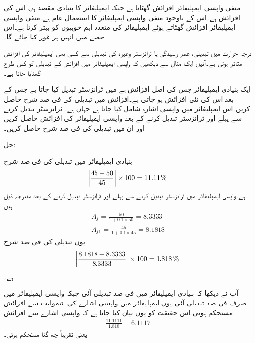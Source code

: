 منفی واپسی ایمپلیفائر افزائش گھٹاتا ہے جبکہ ایمپلیفائر کا بنیادی مقصد ہی اس کی افزائش ہے۔اس کے باوجود منفی واپسی ایمپلیفائر کا استعمال عام ہے۔منفی واپسی ایمپلیفائر افزائش گھٹاتے ہوئے ایمپلیفائر کی متعدد اہم  خوبیوں کو بہتر کرتا ہے۔اس حصے میں انہیں پر غور کیا جائے گا۔



درجہ حرارت میں تبدیلی، عمر رسیدگی یا ٹرانزسٹر وغیرہ کی تبدیلی سے کسی بھی ایمپلیفائر کی افزائش متاثر  ہوتی ہے۔آئیں ایک مثال سے دیکھیں کہ واپسی ایمپلیفائر میں افزائش کے تبدیلی کو کس طرح گھٹایا جاتا ہے۔

ایک بنیادی ایمپلیفائر جس کی اصل افزائش   ہے میں ٹرانزسٹر تبدیل کیا جاتا ہے جس کے بعد اس کی نئی افزائش   ہو جاتی ہے۔افزائش میں تبدیلی  کی فی صد شرح حاصل کریں۔اس ایمپلیفائر میں واپسی اشارہ شامل کیا جاتا ہے جہاں  ہے۔ ٹرانزسٹر تبدیل کرنے سے پہلے اور ٹرانزسٹر تبدیل کرنے کے بعد واپسی ایمپلیفائر کی افزائش حاصل کریں اور ان میں تبدیلی کی فی صد شرح حاصل کریں۔

حل:

بنیادی ایمپلیفائر میں تبدیلی کی فی صد شرح 
\begin{align*}
\abs{\frac{45-50}{45}} \times 100=\SI{11.11}{\%}
\end{align*}
ہے۔واپسی ایمپلیفائر  میں ٹرانزسٹر تبدیل کرنے سے پہلے  اور ٹرانزسٹر تبدیل کرنے کے بعد  مندرجہ ذیل ہیں
\begin{align*}
A_{f}=\frac{50}{1+0.1 \times 50}=\num{8.3333} \\
A_{f1}=\frac{45}{1+0.1 \times 45}=\num{8.1818}
\end{align*}
یوں تبدیلی کی فی صد شرح
\begin{align*}
\abs{\frac{8.1818-8.3333}{8.3333}} \times 100=\SI{1.818}{\%}
\end{align*}
ہے۔

آپ نے دیکھا کہ بنیادی ایمپلیفائر میں  فی صد تبدیلی آئی جبکہ واپسی ایمپلیفائر میں صرف  فی صد تبدیلی آئی۔یوں ایمپلیفائر میں واپسی اشارے کی شمولیت سے افزائش مستحکم ہوئی۔اس حقیقت کو یوں بیان کیا جاتا ہے کہ واپسی اشارے سے افزائش
\begin{align*}
\frac{11.1111}{1.818}=\num{6.1117}
\end{align*}
یعنی تقریباً چھ    گنا مستحکم ہوئی۔

